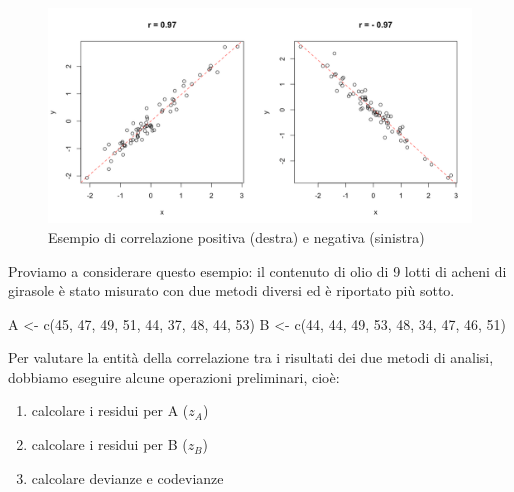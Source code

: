 \documentclass[a4paper,12pt,oneside]{book}
\providecommand{\tightlist}{%
  \setlength{\itemsep}{0pt}\setlength{\parskip}{0pt}}
\newenvironment{Shaded}{\begin{snugshade}}{\end{snugshade}}
\newcommand{\DecValTok}[1]{#1}
\newcommand{\OtherTok}[1]{#1}
\newcommand{\FunctionTok}[1]{#1}
\newcommand{\NormalTok}[1]{#1}
\begin{document}
\begin{figure}

{\centering \includegraphics[width=0.85\linewidth]{_images/CorrelationExample} 

}

\caption{Esempio di correlazione positiva (destra) e negativa (sinistra)}\label{fig:figName311}
\end{figure}

Proviamo a considerare questo esempio: il contenuto di olio di 9 lotti di acheni di girasole è stato misurato con due metodi diversi ed è riportato più sotto.

\begin{Shaded}
\begin{Highlighting}[]
\NormalTok{A }\OtherTok{\textless{}{-}} \FunctionTok{c}\NormalTok{(}\DecValTok{45}\NormalTok{, }\DecValTok{47}\NormalTok{, }\DecValTok{49}\NormalTok{, }\DecValTok{51}\NormalTok{, }\DecValTok{44}\NormalTok{, }\DecValTok{37}\NormalTok{, }\DecValTok{48}\NormalTok{, }\DecValTok{44}\NormalTok{, }\DecValTok{53}\NormalTok{)}
\NormalTok{B }\OtherTok{\textless{}{-}} \FunctionTok{c}\NormalTok{(}\DecValTok{44}\NormalTok{, }\DecValTok{44}\NormalTok{, }\DecValTok{49}\NormalTok{, }\DecValTok{53}\NormalTok{, }\DecValTok{48}\NormalTok{, }\DecValTok{34}\NormalTok{, }\DecValTok{47}\NormalTok{, }\DecValTok{46}\NormalTok{, }\DecValTok{51}\NormalTok{)}
\end{Highlighting}
\end{Shaded}

Per valutare la entità della correlazione tra i risultati dei due metodi di analisi, dobbiamo eseguire alcune operazioni preliminari, cioè:

\begin{enumerate}
\def\labelenumi{\arabic{enumi}.}
\tightlist
\item
  calcolare i residui per A (\(z_A\))
\item
  calcolare i residui per B (\(z_B\))
\item
  calcolare devianze e codevianze
\end{enumerate}
\end{document}
